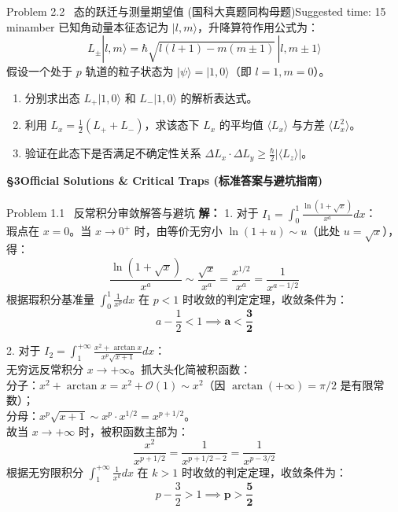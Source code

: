 \documentclass[a4paper,11pt]{article}
\begin{document}
\begin{problembox}{Problem 2.2 \textbar\ 态的跃迁与测量期望值 (国科大真题同构母题)}{Suggested time: 15\,min}{amber}
已知角动量本征态记为 $|l, m\rangle$，升降算符作用公式为：
\[ L_\pm |l, m\rangle = \hbar \sqrt{l(l+1) - m(m \pm 1)} \, |l, m \pm 1\rangle \]
假设一个处于 $p$ 轨道的粒子状态为 $|\psi\rangle = |1, 0\rangle$（即 $l=1, m=0$）。
\begin{enumerate}
    \item 分别求出态 $L_+ |1, 0\rangle$ 和 $L_- |1, 0\rangle$ 的解析表达式。
    \item 利用 $L_x = \frac{1}{2}(L_+ + L_-)$，求该态下 $L_x$ 的平均值 $\langle L_x \rangle$ 与方差 $\langle L_x^2 \rangle$。
    \item 验证在此态下是否满足不确定性关系 $\Delta L_x \cdot \Delta L_y \ge \frac{\hbar}{2} |\langle L_z \rangle|$。
\end{enumerate}
\end{problembox}
\vspace{9.5cm}

\clearpage
{\Large\sffamily\bfseries\color{navy} \S 3\quad Official Solutions \& Critical Traps (标准答案与避坑指南)}

\begin{solution}{Problem 1.1 \textbar\ 反常积分审敛解答与避坑}
\textbf{解：}
1. 对于 $I_1 = \int_0^1 \frac{\ln(1+\sqrt{x})}{x^a} dx$：\\
瑕点在 $x = 0$。当 $x \to 0^+$ 时，由等价无穷小 $\ln(1+u) \sim u$（此处 $u=\sqrt{x}$），得：
\[ \frac{\ln(1+\sqrt{x})}{x^a} \sim \frac{\sqrt{x}}{x^a} = \frac{x^{1/2}}{x^a} = \frac{1}{x^{a - 1/2}} \]
根据瑕积分基准量 $\int_0^1 \frac{1}{x^p} dx$ 在 $p < 1$ 时收敛的判定定理，收敛条件为：
\[ a - \frac{1}{2} < 1 \implies \mathbf{a < \frac{3}{2}} \]

2. 对于 $I_2 = \int_1^{+\infty} \frac{x^2 + \arctan x}{x^p \sqrt{x+1}} dx$：\\
无穷远反常积分 $x \to +\infty$。抓大头化简被积函数：\\
分子：$x^2 + \arctan x = x^2 + \mathcal{O}(1) \sim x^2$（因 $\arctan(+\infty) = \pi/2$ 是有限常数）；\\
分母：$x^p \sqrt{x+1} \sim x^p \cdot x^{1/2} = x^{p + 1/2}$。\\
故当 $x \to +\infty$ 时，被积函数主部为：
\[ \frac{x^2}{x^{p + 1/2}} = \frac{1}{x^{p + 1/2 - 2}} = \frac{1}{x^{p - 3/2}} \]
根据无穷限积分 $\int_1^{+\infty} \frac{1}{x^k} dx$ 在 $k > 1$ 时收敛的判定定理，收敛条件为：
\[ p - \frac{3}{2} > 1 \implies \mathbf{p > \frac{5}{2}} \]
\end{solution}
\end{document}
